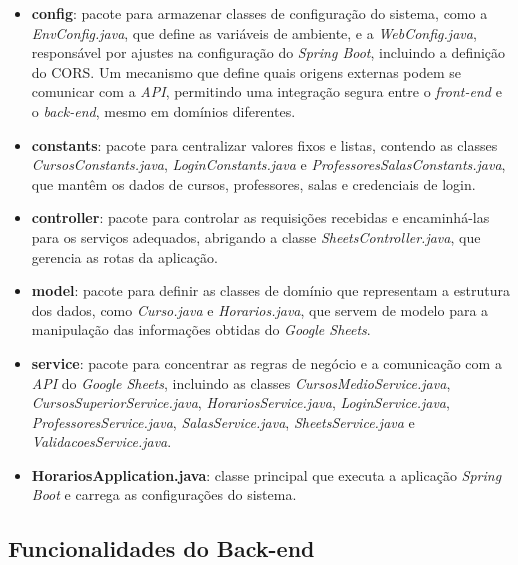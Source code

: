 \begin{itemize}
    \item \textbf{config}: pacote para armazenar classes de configuração do sistema, como a \textit{EnvConfig.java}, que define as variáveis de ambiente, e a \textit{WebConfig.java}, responsável por ajustes na configuração do \textit{Spring Boot}, incluindo a definição do CORS. Um mecanismo que define quais origens externas podem se comunicar com a \textit{API}, permitindo uma integração segura entre o \textit{front-end} e o \textit{back-end}, mesmo em domínios diferentes.
    \item \textbf{constants}: pacote para centralizar valores fixos e listas, contendo as classes \textit{CursosConstants.java}, \textit{LoginConstants.java} e \textit{ProfessoresSalasConstants.java}, que mantêm os dados de cursos, professores, salas e credenciais de login.
    \item \textbf{controller}: pacote para controlar as requisições recebidas e encaminhá-las para os serviços adequados, abrigando a classe \textit{SheetsController.java}, que gerencia as rotas da aplicação.
    \item \textbf{model}: pacote para definir as classes de domínio que representam a estrutura dos dados, como \textit{Curso.java} e \textit{Horarios.java}, que servem de modelo para a manipulação das informações obtidas do \textit{Google Sheets}.
    \item \textbf{service}: pacote para concentrar as regras de negócio e a comunicação com a \textit{API} do \textit{Google Sheets}, incluindo as classes \textit{CursosMedioService.java}, \textit{CursosSuperiorService.java}, \textit{HorariosService.java}, \textit{LoginService.java}, \textit{ProfessoresService.java}, \textit{SalasService.java}, \textit{SheetsService.java} e \textit{ValidacoesService.java}.
    \item \textbf{HorariosApplication.java}: classe principal que executa a aplicação \textit{Spring Boot} e carrega as configurações do sistema.
\end{itemize}

\subsection{Funcionalidades do Back-end}

